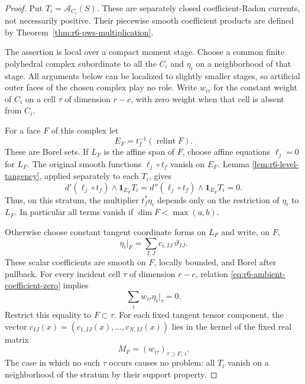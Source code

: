 \documentclass[11pt,a4paper]{article}
\numberwithin{equation}{section}
\theoremstyle{definition}
\theoremstyle{remark}
\begin{document}
\begin{proof}
Put $T_i=\mathcal A_{C_i}(S)$.  These are separately closed
coefficient-Radon currents, not necessarily positive.  Their
piecewise smooth coefficient products are defined by
Theorem~\ref{thm:r6-pws-multiplication}.

The assertion is local over a compact moment stage.  Choose a
common finite polyhedral complex subordinate to all the $C_i$ and
$\eta_i$ on a neighborhood of that stage.  All arguments below
can be localized to slightly smaller stages, so artificial outer
faces of the chosen complex play no role.  Write $w_{i\tau}$ for
the constant weight of $C_i$ on a cell $\tau$ of dimension $r-c$,
with zero weight when that cell is absent from $C_i$.

For a face $F$ of this complex let
\[
                            E_F=t_f^{-1}(\operatorname{relint}F).
\]
These are Borel sets.  If $L_F$ is the affine span of $F$, choose
affine equations $\ell_j=0$ for $L_F$.  The original smooth
functions $\ell_j\circ t_f$ vanish on $E_F$.  Lemma
\ref{lem:r6-level-tangency}, applied separately to each $T_i$, gives
\[
 d'(\ell_j\circ t_f)\wedge\mathbf1_{E_F}T_i
   =d''(\ell_j\circ t_f)\wedge\mathbf1_{E_F}T_i=0.
\]
Thus, on this stratum, the multiplier $t_f^*\eta_i$ depends only
on the restriction of $\eta_i$ to $L_F$.  In particular all terms
vanish if $\dim F<\max(a,b)$.

Otherwise choose constant tangent coordinate forms on $L_F$ and
write, on $F$,
\[
                         \eta_i|_F=\sum_{I,J}c_{i,IJ}\,\vartheta_{IJ}.
\]
These scalar coefficients are smooth on $F$, locally bounded, and
Borel after pullback.  For every incident cell $\tau$ of dimension
$r-c$, relation \eqref{eq:r6-ambient-coefficient-zero} implies
\[
                   \sum_iw_{i\tau}\eta_i|_\tau=0.
\]
Restrict this equality to $F\subset\tau$.  For each fixed tangent
tensor component, the vector
$c_{IJ}(x)=(c_{1,IJ}(x),\ldots,c_{N,IJ}(x))$ lies in the kernel
of the fixed real matrix
\[
                         M_F=(w_{i\tau})_{\tau\supset F,\ i}.
\]
The case in which no such $\tau$ occurs causes no problem: all
$T_i$ vanish on a neighborhood of the stratum by their support
property.


\end{proof}
\end{document}

